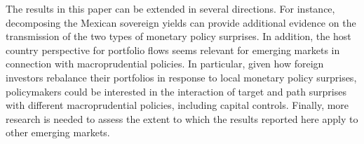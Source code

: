 {The results in this paper can be extended in several directions. 
For instance, decomposing the Mexican sovereign yields can provide additional evidence on the transmission of the two types of monetary policy surprises. In addition, the  host country perspective for portfolio flows seems relevant for emerging markets in connection with macroprudential policies. In particular, given how foreign investors rebalance their portfolios in response to local monetary policy surprises, policymakers could be interested in the interaction of target and path surprises with different macroprudential policies, including capital controls. Finally, more research is needed to assess the extent to which the results reported here apply to other emerging markets.

}{}	%




\uspunctuation
\begin{singlespace}
	\printbibliography
\end{singlespace}




